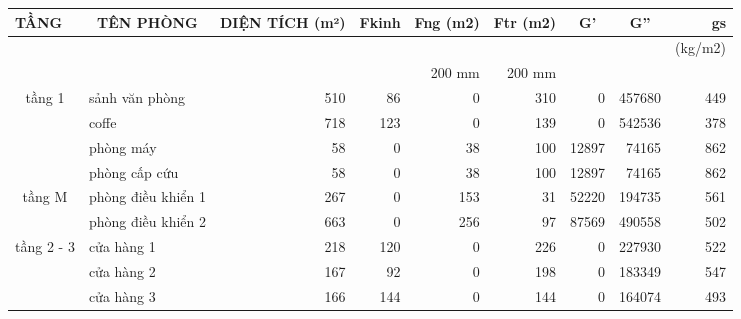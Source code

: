 \begin{landscape}
\begin{table}[H]
	\centering
	\begin{adjustbox}{width=1.4\textheight}
	\begin{tabular}{|c|l|r|r|r|r|r|r|r|}
		\hline
		\multicolumn{1}{|l|}{\textbf{ TẦNG}} & \multicolumn{1}{c|}{\textbf{TÊN PHÒNG}} & \multicolumn{1}{p{4.93em}|}{\textbf{DIỆN TÍCH (m²) }} & \multicolumn{1}{p{4.855em}|}{\textbf{Fkinh}} & \multicolumn{1}{p{5.215em}|}{\textbf{Fng (m2)}} & \multicolumn{1}{p{5.07em}|}{\textbf{Ftr (m2)}} & \multicolumn{1}{c|}{\textbf{G'}} & \multicolumn{1}{c|}{\textbf{G''}} & \multicolumn{1}{p{4.07em}|}{\textbf{gs}} \bigstrut\\
		\hline
		&          &          &          &          &          &          &          & \multicolumn{1}{p{4.07em}|}{(kg/m2)} \bigstrut\\
		\hline
		&          &          &          & \multicolumn{1}{p{5.215em}|}{200 mm} & \multicolumn{1}{p{5.07em}|}{200 mm} &          &          &  \bigstrut\\
		\hline
		\multirow{4}[8]{*}{tầng 1} & sảnh văn phòng & 510      & 86       & 0        & 310      & 0        & 457680   & 449 \bigstrut\\
		\cline{2-9}         & coffe    & 718      & 123      & 0        & 139      & 0        & 542536   & 378 \bigstrut\\
		\cline{2-9}         & phòng máy & 58       & 0        & 38       & 100      & 12897    & 74165    & 862 \bigstrut\\
		\cline{2-9}         & phòng cấp cứu & 58       & 0        & 38       & 100      & 12897    & 74165    & 862 \bigstrut\\
		\hline
		\multirow{2}[4]{*}{tầng M} & phòng điều khiển 1 & 267      & 0        & 153      & 31       & 52220    & 194735   & 561 \bigstrut\\
		\cline{2-9}         & phòng điều khiển 2 & 663      & 0        & 256      & 97       & 87569    & 490558   & 502 \bigstrut\\
		\hline
		\multirow{6}[12]{*}{tầng 2 - 3} & cửa hàng 1 & 218      & 120      & 0        & 226      & 0        & 227930   & 522 \bigstrut\\
		\cline{2-9}         & cửa hàng 2 & 167      & 92       & 0        & 198      & 0        & 183349   & 547 \bigstrut\\
		\cline{2-9}         & cửa hàng 3 & 166      & 144      & 0        & 144      & 0        & 164074   & 493 \bigstrut\\

\end{tabular}
\end{adjustbox}
\end{table}
\end{landscape}

